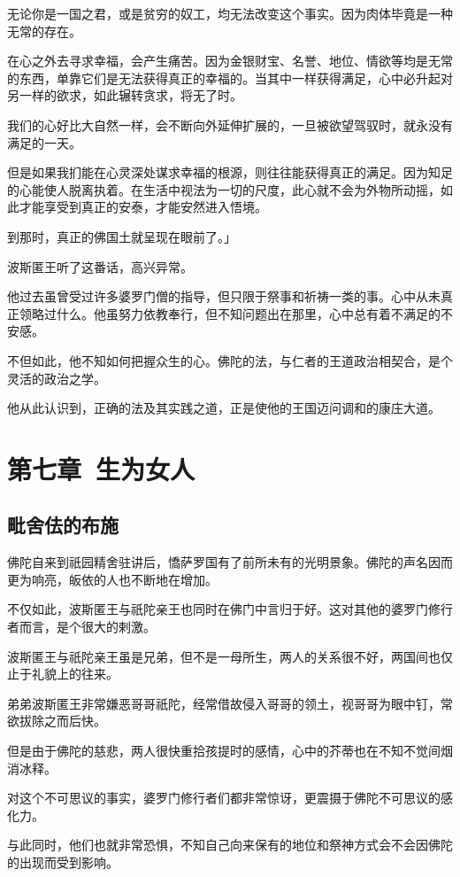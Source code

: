 \documentclass[twoside,openany]{book}
\begin{document}
无论你是一国之君，或是贫穷的奴工，均无法改变这个事实。因为肉体毕竟是一种无常的存在。

在心之外去寻求幸福，会产生痛苦。因为金银财宝、名誉、地位、情欲等均是无常的东西，单靠它们是无法获得真正的幸福的。当其中一样获得满足，心中必升起对另一样的欲求，如此辗转贪求，将无了时。

我们的心好比大自然一样，会不断向外延伸扩展的，一旦被欲望驾驭时，就永没有满足的一天。

但是如果我扪能在心灵深处谋求幸福的根源，则往往能获得真正的满足。因为知足的心能使人脱离执着。在生活中视法为一切的尺度，此心就不会为外物所动摇，如此才能享受到真正的安泰，才能安然进入悟境。

到那时，真正的佛国土就呈现在眼前了。」

波斯匿王听了这番话，高兴异常。

他过去虽曾受过许多婆罗门僧的指导，但只限于祭事和祈祷一类的事。心中从未真正领略过什么。他虽努力依教奉行，但不知问题出在那里，心中总有着不满足的不安感。

不但如此，他不知如何把握众生的心。佛陀的法，与仁者的王道政治相契合，是个灵活的政治之学。

他从此认识到，正确的法及其实践之道，正是使他的王国迈问调和的康庄大道。

\chapter{第七章\ 生为女人}\label{ch7}

\section{毗舍佉的布施}\label{sec7.1}

佛陀自来到祇园精舍驻讲后，憍萨罗国有了前所未有的光明景象。佛陀的声名因而更为响亮，皈依的人也不断地在增加。

不仅如此，波斯匿王与祇陀亲王也同时在佛门中言归于好。这对其他的婆罗门修行者而言，是个很大的剌激。

波斯匿王与祇陀亲王虽是兄弟，但不是一母所生，两人的关系很不好，两国间也仅止于礼貌上的往来。

弟弟波斯匿王非常嫌恶哥哥祇陀，经常借故侵入哥哥的领土，视哥哥为眼中钉，常欲拔除之而后快。

但是由于佛陀的慈悲，两人很快重拾孩提时的感情，心中的芥蒂也在不知不觉间烟消冰释。

对这个不可思议的事实，婆罗门修行者们都非常惊讶，更震摄于佛陀不可思议的感化力。

与此同时，他们也就非常恐惧，不知自己向来保有的地位和祭神方式会不会因佛陀的出现而受到影响。
\end{document}
